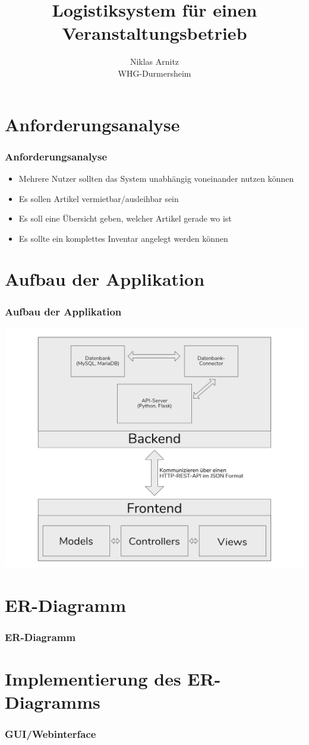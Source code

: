 \documentclass{beamer}
\title{Logistiksystem für einen Veranstaltungsbetrieb}
\author{Niklas Arnitz\\WHG-Durmersheim}
\begin{document}
\begin{frame}
	\maketitle
\end{frame}

\begin{frame}
	\tableofcontents
\end{frame}

\section{Anforderungsanalyse}
\begin{frame}
	\frametitle{Anforderungsanalyse}
	
	\begin{itemize}
		\item Mehrere Nutzer sollten das System unabhängig voneinander nutzen können
		\item Es sollen Artikel vermietbar/ausleihbar sein
		\item Es soll eine Übersicht geben, welcher Artikel gerade wo ist
		\item Es sollte ein komplettes Inventar angelegt werden können
	\end{itemize}
\end{frame}

\section{Aufbau der Applikation}
\begin{frame}
	\frametitle{Aufbau der Applikation}
	\includegraphics[width=\textwidth]{01-logistiksystem-aufbau}
\end{frame}

\section{ER-Diagramm}
\begin{frame}
	\frametitle{ER-Diagramm}
\end{frame}

\section{Implementierung des ER-Diagramms}
\begin{frame}
	\frametitle{GUI/Webinterface}
\end{frame}
\end{document}
